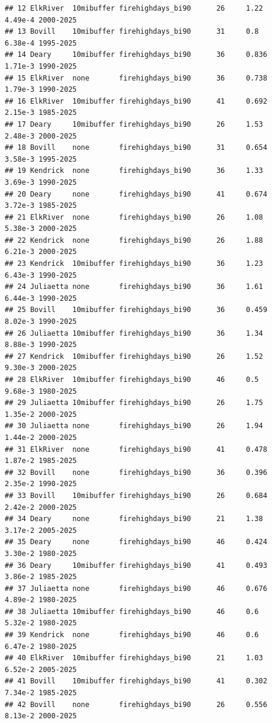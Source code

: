 \documentclass[
]{article}
\begin{document}
\begin{verbatim}
## 12 ElkRiver  10mibuffer firehighdays_bi90      26     1.22    4.49e-4 2000-2025 
## 13 Bovill    10mibuffer firehighdays_bi90      31     0.8     6.38e-4 1995-2025 
## 14 Deary     10mibuffer firehighdays_bi90      36     0.836   1.71e-3 1990-2025 
## 15 ElkRiver  none       firehighdays_bi90      36     0.738   1.79e-3 1990-2025 
## 16 ElkRiver  10mibuffer firehighdays_bi90      41     0.692   2.15e-3 1985-2025 
## 17 Deary     10mibuffer firehighdays_bi90      26     1.53    2.48e-3 2000-2025 
## 18 Bovill    none       firehighdays_bi90      31     0.654   3.58e-3 1995-2025 
## 19 Kendrick  none       firehighdays_bi90      36     1.33    3.69e-3 1990-2025 
## 20 Deary     none       firehighdays_bi90      41     0.674   3.72e-3 1985-2025 
## 21 ElkRiver  none       firehighdays_bi90      26     1.08    5.38e-3 2000-2025 
## 22 Kendrick  none       firehighdays_bi90      26     1.88    6.21e-3 2000-2025 
## 23 Kendrick  10mibuffer firehighdays_bi90      36     1.23    6.43e-3 1990-2025 
## 24 Juliaetta none       firehighdays_bi90      36     1.61    6.44e-3 1990-2025 
## 25 Bovill    10mibuffer firehighdays_bi90      36     0.459   8.02e-3 1990-2025 
## 26 Juliaetta 10mibuffer firehighdays_bi90      36     1.34    8.88e-3 1990-2025 
## 27 Kendrick  10mibuffer firehighdays_bi90      26     1.52    9.30e-3 2000-2025 
## 28 ElkRiver  10mibuffer firehighdays_bi90      46     0.5     9.68e-3 1980-2025 
## 29 Juliaetta 10mibuffer firehighdays_bi90      26     1.75    1.35e-2 2000-2025 
## 30 Juliaetta none       firehighdays_bi90      26     1.94    1.44e-2 2000-2025 
## 31 ElkRiver  none       firehighdays_bi90      41     0.478   1.87e-2 1985-2025 
## 32 Bovill    none       firehighdays_bi90      36     0.396   2.35e-2 1990-2025 
## 33 Bovill    10mibuffer firehighdays_bi90      26     0.684   2.42e-2 2000-2025 
## 34 Deary     none       firehighdays_bi90      21     1.38    3.17e-2 2005-2025 
## 35 Deary     none       firehighdays_bi90      46     0.424   3.30e-2 1980-2025 
## 36 Deary     10mibuffer firehighdays_bi90      41     0.493   3.86e-2 1985-2025 
## 37 Juliaetta none       firehighdays_bi90      46     0.676   4.89e-2 1980-2025 
## 38 Juliaetta 10mibuffer firehighdays_bi90      46     0.6     5.32e-2 1980-2025 
## 39 Kendrick  none       firehighdays_bi90      46     0.6     6.47e-2 1980-2025 
## 40 ElkRiver  10mibuffer firehighdays_bi90      21     1.03    6.52e-2 2005-2025 
## 41 Bovill    10mibuffer firehighdays_bi90      41     0.302   7.34e-2 1985-2025 
## 42 Bovill    none       firehighdays_bi90      26     0.556   8.13e-2 2000-2025 

\end{verbatim}
\end{document}

